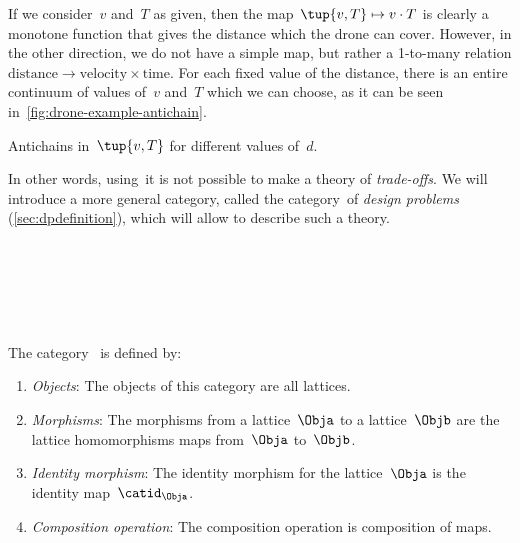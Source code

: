 {\begin{example}
        If we consider~$v$ and~$T$ as given, then the map~$\tup{v,T} \mapsto v\cdot T$ is clearly a monotone function that gives the distance which the drone can cover.
        However, in the other direction, we do not have a simple map, but rather a 1-to-many relation $\mathrm{distance}\to \mathrm{velocity}\times \mathrm{time}$.
        For each fixed value of the distance, there is an entire continuum of values of~$v$ and~$T$ which we can choose, as it can be seen in~\cref{fig:drone-example-antichain}.

        \begin{marginfigure}
            \centering
            \caption{Antichains in~$\tup{v,T}$ for different values of~$d$.}
            \label{fig:drone-example-antichain}
        \end{marginfigure}

    \end{example}

    In other words, using~\Pos it is not possible to make a theory of \emph{trade-offs}.
    We will introduce a more general category, called the category~\DP of \emph{design problems} (\cref{sec:dpdefinition}), which will allow to describe such a theory.

}


\

\

\

\begin{ctdefinition}
    \label{def:Lat}
    The category~\iindex{\Lat} is defined by:
    \begin{enumerate}
        \item \emph{Objects}: The objects of this category are all lattices.
        \item \emph{Morphisms}: The morphisms from a lattice~$\Obja$ to a lattice~$\Objb$ are the lattice homomorphisms maps from~$\Obja$ to~$\Objb$.
        \item \emph{Identity morphism}: The identity morphism for the lattice~$\Obja$
              is the identity map~$\catid_\Obja$.
        \item \emph{Composition operation}: The composition operation is composition of maps.
    \end{enumerate}
\end{ctdefinition}


